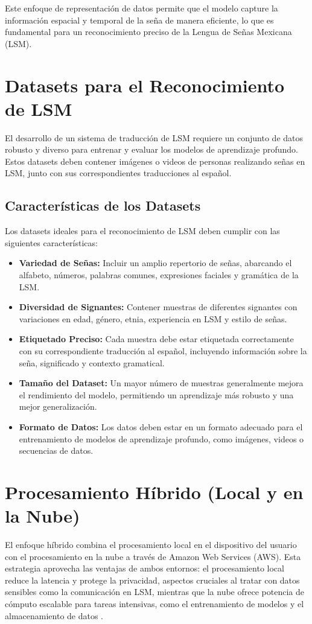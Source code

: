 Este enfoque de representación de datos permite que el modelo capture la información espacial y temporal de la seña de manera eficiente, lo que es fundamental para un reconocimiento preciso de la Lengua de Señas Mexicana (LSM).

\section{Datasets para el Reconocimiento de LSM}

El desarrollo de un sistema de traducción de LSM requiere un conjunto de datos robusto y diverso para entrenar y evaluar los modelos de aprendizaje profundo. Estos datasets deben contener imágenes o videos de personas realizando señas en LSM, junto con sus correspondientes traducciones al español.

\subsection{Características de los Datasets}

Los datasets ideales para el reconocimiento de LSM deben cumplir con las siguientes características:

\begin{itemize}
    \item \textbf{Variedad de Señas:} Incluir un amplio repertorio de señas, abarcando el alfabeto, números, palabras comunes, expresiones faciales y gramática de la LSM.
    \item \textbf{Diversidad de Signantes:} Contener muestras de diferentes signantes con variaciones en edad, género, etnia, experiencia en LSM y estilo de señas.
    \item \textbf{Etiquetado Preciso:} Cada muestra debe estar etiquetada correctamente con su correspondiente traducción al español, incluyendo información sobre la seña, significado y contexto gramatical.
    \item \textbf{Tamaño del Dataset:} Un mayor número de muestras generalmente mejora el rendimiento del modelo, permitiendo un aprendizaje más robusto y una mejor generalización.
    \item \textbf{Formato de Datos:} Los datos deben estar en un formato adecuado para el entrenamiento de modelos de aprendizaje profundo, como imágenes, videos o secuencias de datos.
\end{itemize}

\section{Procesamiento Híbrido (Local y en la Nube)}
El enfoque híbrido combina el procesamiento local en el dispositivo del usuario con el procesamiento en la nube a través de Amazon Web Services (AWS). Esta estrategia aprovecha las ventajas de ambos entornos: el procesamiento local reduce la latencia y protege la privacidad, aspectos cruciales al tratar con datos sensibles como la comunicación en LSM, mientras que la nube ofrece potencia de cómputo escalable para tareas intensivas, como el entrenamiento de modelos y el almacenamiento de datos \cite{ref35}.

